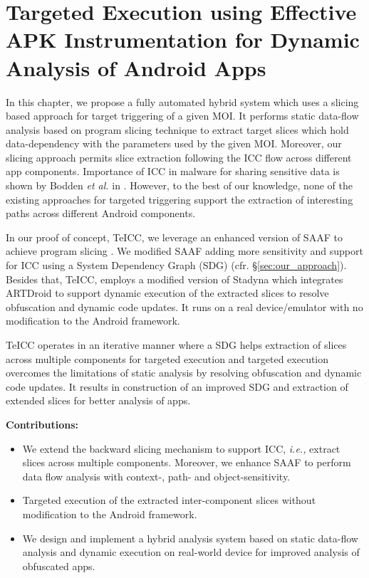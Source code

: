 \chapter{Targeted Execution using Effective APK Instrumentation for Dynamic Analysis of Android Apps}
\label{sec:teicc}

In this chapter, we propose a fully automated hybrid system which uses a slicing based approach for target triggering of a given MOI. It performs static data-flow analysis \cite{allen1976program,fosdick1976data} based on program slicing technique \cite{weiser1981program} to extract target slices which hold data-dependency with the parameters used by the given MOI. Moreover, our slicing approach permits slice extraction following the ICC flow across different app components. Importance of ICC in malware for sharing sensitive data is shown by Bodden \textit{et al.} in \cite{li2015iccta}. However, to the best of our knowledge, none of the existing approaches \cite{rasthofer2016harvesting, backes2016r} for targeted triggering support the extraction of interesting paths across different Android components.  

In our proof of concept, TeICC, we leverage an enhanced version of SAAF to achieve program slicing \cite{hoffmann2013slicing}. We modified SAAF adding more sensitivity and support for ICC using a System Dependency Graph (SDG) (cfr. \S \ref{sec:our_approach}). Besides that, TeICC, employs a modified version of Stadyna \cite{zhauniarovich2015stadyna} which integrates ARTDroid \cite{costamagnaartdroid} to support dynamic execution of the extracted slices to resolve obfuscation and dynamic code updates. It runs on a real device/emulator with no modification to the Android framework.

TeICC operates in an iterative manner where a SDG helps extraction of slices across multiple components for targeted execution and targeted execution overcomes the limitations of static analysis by resolving obfuscation and dynamic code updates. It results in construction of an improved SDG and extraction of extended slices for better analysis of apps. 

\textbf{Contributions:}
\begin{itemize}
\item We extend the backward slicing mechanism to support ICC, \textit{i.e.,} extract slices across multiple components. Moreover, we enhance SAAF to perform data flow analysis with context-, path- and  object-sensitivity.

\item Targeted execution of the extracted inter-component slices without modification to the Android framework.

\item We design and implement a hybrid analysis system based on static data-flow analysis and dynamic execution on real-world device for improved analysis of obfuscated apps.
\end{itemize}